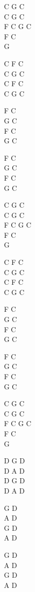 \begin{chord}
    C G C\\
    C G C\\
    F C G C\\
    F C\\
    G

    C F C\\
    C G C\\
    C F C\\
    C G C

    F C\\
    G C\\
    F C\\
    G C

    F C\\
    G C\\
    F C\\
    G C

    C G C\\
    C G C\\
    F C G C\\
    F C\\
    G

    C F C\\
    C G C\\
    C F C\\
    C G C

    F C\\
    G C\\
    F C\\
    G C

    F C\\
    G C\\
    F C\\
    G C
	
    C G C\\
    C G C\\
    F C G C\\
    F C\\
    G

    D G D\\
    D A D\\
    D G D\\
    D A D

    G D\\
    A D\\
    G D\\
    A D

    G D\\
    A D\\
    G D\\
    A D
\end{chord}